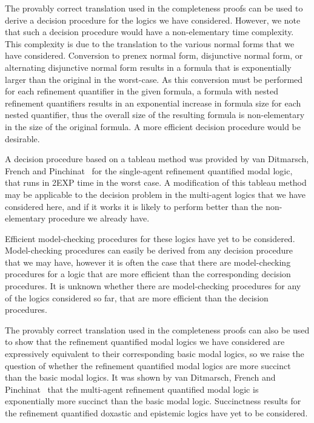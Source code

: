 The provably correct translation used in the completeness proofs can be used to
derive a decision procedure for the logics we have considered. However, we note
that such a decision procedure would have a non-elementary time complexity. This
complexity is due to the translation to the various normal forms that we have
considered. Conversion to prenex normal form, disjunctive normal form, or
alternating disjunctive normal form results in a formula that is exponentially
larger than the original in the worst-case. As this conversion must be performed
for each refinement quantifier in the given formula, a formula with nested
refinement quantifiers results in an exponential increase in formula size for each
nested quantifier, thus the overall size of the resulting formula is
non-elementary in the size of the original formula. A more efficient decision
procedure would be desirable.

A decision procedure based on a tableau method was provided by van Ditmarsch,
French and Pinchinat~\cite{french2010future} for the single-agent refinement
quantified modal logic, that runs in 2EXP time in the worst case. A modification
of this tableau method may be applicable to the decision problem in the
multi-agent logics that we have considered here, and if it works it is likely to
perform better than the non-elementary procedure we already have.

Efficient model-checking procedures for these logics have yet to be considered.
Model-checking procedures can easily be derived from any decision procedure that
we may have, however it is often the case that there are model-checking
procedures for a logic that are more efficient than the corresponding decision
procedures. It is unknown whether there are model-checking procedures for any of
the logics considered so far, that are more efficient than the decision
procedures.

The provably correct translation used in the completeness proofs can also be
used to show that the refinement quantified modal logics we have considered are
expressively equivalent to their corresponding basic modal logics, so we raise
the question of whether the refinement quantified modal logics are more succinct
than the basic modal logics. It was shown by van Ditmarsch, French and
Pinchinat~\cite{french2010future} that the multi-agent refinement quantified
modal logic is exponentially more succinct than the basic modal logic.
Succinctness results for the refinement quantified doxastic and epistemic logics
have yet to be considered.

